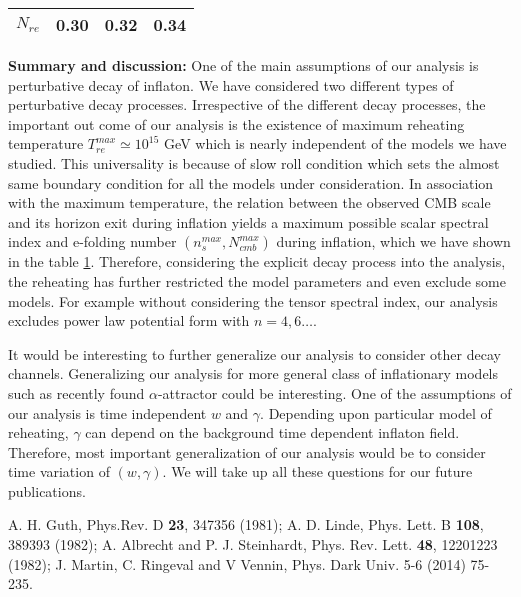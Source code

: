 \documentclass[prl,twocolumn,superscriptaddress,doublespace]{revtex4}%
\begin{document}
{\begin{table}
\begin{tabular}{|c|c|c|c|}
					$N_{re}$ &0.30 &0.32& 0.34\\
					\hline
	\end{tabular}
	\label{table1}
\end{table}

{\bf Summary and discussion:}
One of the main assumptions of our analysis is perturbative decay of inflaton. We have considered two different types of perturbative 
decay processes. Irrespective of the different decay processes, the important out come of our analysis is the existence of maximum reheating temperature $T_{re}^{max} \simeq 10^{15} $ GeV which is nearly independent of the models we have studied. This universality is because of slow roll condition which sets the almost same boundary condition for all the models under consideration. In association with the maximum temperature, the relation between the observed CMB scale and its horizon exit during inflation yields a maximum possible scalar spectral index and e-folding number $(n_s^{max}, N_{cmb}^{max})$ during inflation, which we have shown in the table \ref{table1}. Therefore, considering the explicit decay process into the analysis, the reheating has further restricted the model parameters and even exclude some models. 
For example without considering the tensor spectral index, our analysis excludes power law potential form with $n=4,6 \dots$.      

It would be interesting to further generalize our analysis to consider other decay channels. 
Generalizing our analysis for more general class of inflationary models such as recently found $\alpha$-attractor \cite{alpha} could be interesting. One of the assumptions of our analysis is time independent $w$ and $\gamma$. Depending upon particular model of reheating, $\gamma$ can depend on the background time dependent inflaton field. Therefore, most important generalization of our analysis would be to consider time variation of $(w,\gamma)$. We will take up all these questions for our future publications.  




  \hspace{0.5cm}




\begin{thebibliography}{99}
	
 A. H. Guth, Phys.Rev. D {\bf 23}, 347356 (1981); A. D. Linde, Phys. Lett. B {\bf 108}, 389393 (1982);  
  A. Albrecht and P. J. Steinhardt, Phys. Rev. Lett. {\bf 48}, 12201223 (1982);
  J. Martin, C. Ringeval and V Vennin, Phys. Dark Univ. 5-6 (2014) 75-235.
  

\end{thebibliography}}
\end{document}
